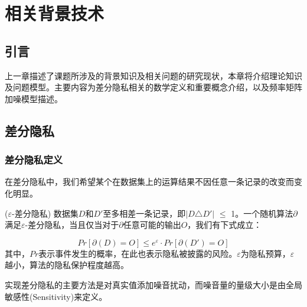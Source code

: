 


\chapter{相关背景技术}
\label{chap:background}

\section{引言}

上一章描述了课题所涉及的背景知识及相关问题的研究现状，本章将介绍理论知识及问题模型。主要内容为差分隐私相关的数学定义和重要概念介绍，以及频率矩阵加噪模型描述。

\section{差分隐私}

\subsection{差分隐私定义}

在差分隐私中，我们希望某个在数据集上的运算结果不因任意一条记录的改变而变化明显。

\begin{defn}
	
($\varepsilon$\textsc{-差分隐私})\cite{Dwork Calibrating} 数据集$D$和$D'$至多相差一条记录，即$|D$$\triangle$$D'|$ $\leqslant$ 1。一个随机算法$\partial$满足$\varepsilon$-差分隐私，当且仅当对于$\partial$任意可能的输出$O$，我们有下式成立：

\begin{equation}

Pr[\partial(D) = O] \leqslant e^{\varepsilon} \cdot Pr[\partial(D') = O]

\end{equation}
其中，$Pr$表示事件发生的概率，在此也表示隐私被披露的风险。$\varepsilon$为隐私预算，$\varepsilon$越小，算法的隐私保护程度越高。

\end{defn}

实现差分隐私的主要方法是对真实值添加噪音扰动，而噪音量的量级大小是由全局敏感性(Sensitivity)来定义。

